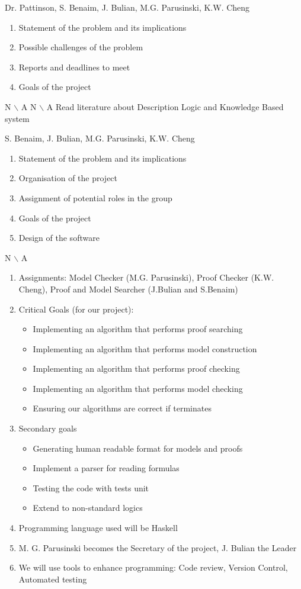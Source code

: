 \label{sec:logbook}

%
{Dr. Pattinson, S. Benaim, J. Bulian, M.G. Parusinski, K.W. Cheng}%
{ \begin{enumerate} \item Statement of the problem and its implications 
 \item Possible challenges of the problem 
 \item Reports and deadlines to meet 
 \item Goals of the project 
\end{enumerate} }%
{ N $\backslash$ A}%
{ N $\backslash$ A}%
{ Read literature about Description Logic and Knowledge Based system}

%
{S. Benaim, J. Bulian, M.G. Parusinski, K.W. Cheng}%
{ \begin{enumerate} \item Statement of the problem and its implications 
 \item Organisation of the project 
 \item Assignment of potential roles in the group
 \item Goals of the project
 \item Design of the software 
\end{enumerate} }%
{N $\backslash$ A}
{ \begin{enumerate}
\item Assignments: Model Checker (M.G. Parusinski), Proof Checker (K.W. Cheng),
Proof and Model Searcher (J.Bulian and S.Benaim)
\item Critical Goals (for our project):
\begin{itemize}
\item Implementing an algorithm that performs proof searching
\item Implementing an algorithm that performs model construction
\item Implementing an algorithm that performs proof checking
\item Implementing an algorithm that performs model checking
\item Ensuring our algorithms are correct if terminates
\end{itemize}
\item Secondary goals \begin{itemize}
\item Generating human readable format for models and proofs
\item Implement a parser for reading formulas
\item Testing the code with tests unit
\item Extend to non-standard logics
\end{itemize}
\item Programming language used will be Haskell
\item M. G. Parusinski becomes the Secretary of the project, J. Bulian the Leader
\item We will use tools to enhance programming: Code review, Version Control, Automated testing
\end{enumerate} }%
